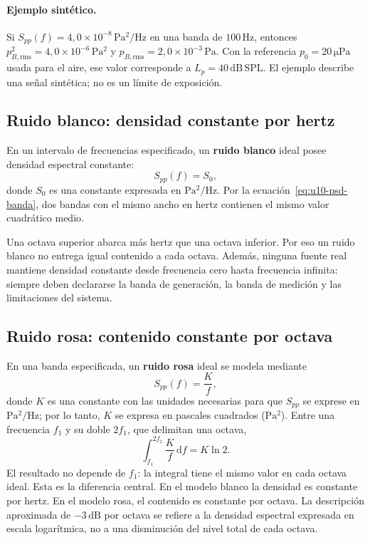 \paragraph{Ejemplo sintético.}
Si \(S_{pp}(f)=4{,}0\times10^{-8}\,\mathrm{Pa^2/Hz}\) en una banda de
\(100\,\mathrm{Hz}\), entonces
\(p_{B,\mathrm{rms}}^2=4{,}0\times10^{-6}\,\mathrm{Pa^2}\) y
\(p_{B,\mathrm{rms}}=2{,}0\times10^{-3}\,\mathrm{Pa}\). Con la referencia
\(p_0=20\,\mathrm{\mu Pa}\) usada para el aire, ese valor corresponde a
\(L_p=40\,\mathrm{dB\,SPL}\). El ejemplo describe una señal sintética; no es
un límite de exposición.

\subsection{Ruido blanco: densidad constante por hertz}
\label{sec:u10-ruido-blanco}

En un intervalo de frecuencias especificado, un \textbf{ruido blanco} ideal
posee densidad espectral constante:
\begin{equation}
    S_{pp}(f)=S_0,
    \label{eq:u10-blanco}
\end{equation}
donde \(S_0\) es una constante expresada en
\(\mathrm{Pa^2/Hz}\). Por la ecuación~\eqref{eq:u10-psd-banda}, dos bandas con
el mismo ancho en hertz contienen el mismo valor cuadrático medio.

Una octava superior abarca más hertz que una octava inferior. Por eso un ruido
blanco no entrega igual contenido a cada octava. Además, ninguna fuente real
mantiene densidad constante desde frecuencia cero hasta frecuencia infinita:
siempre deben declararse la banda de generación, la banda de medición y las
limitaciones del sistema.

\subsection{Ruido rosa: contenido constante por octava}
\label{sec:u10-ruido-rosa}

En una banda especificada, un \textbf{ruido rosa} ideal se modela mediante
\begin{equation}
    S_{pp}(f)=\frac{K}{f},
    \label{eq:u10-rosa}
\end{equation}
donde \(K\) es una constante con las unidades necesarias para que
\(S_{pp}\) se exprese en \(\mathrm{Pa^2/Hz}\); por lo tanto, \(K\) se expresa
en pascales cuadrados (\(\mathrm{Pa^2}\)). Entre una frecuencia \(f_1\) y
su doble \(2f_1\), que delimitan una octava,
\begin{equation}
    \int_{f_1}^{2f_1}\frac{K}{f}\,\mathrm{d}f=K\ln 2.
    \label{eq:u10-rosa-octava}
\end{equation}
El resultado no depende de \(f_1\): la integral tiene el mismo valor en cada
octava ideal. Esta es la diferencia central. En el modelo blanco la densidad
es constante por hertz. En el modelo rosa, el contenido es constante por
octava. La descripción aproximada de
\(-3\,\mathrm{dB}\) por octava se refiere a la densidad espectral expresada
en escala logarítmica, no a una disminución del nivel total de cada octava.

